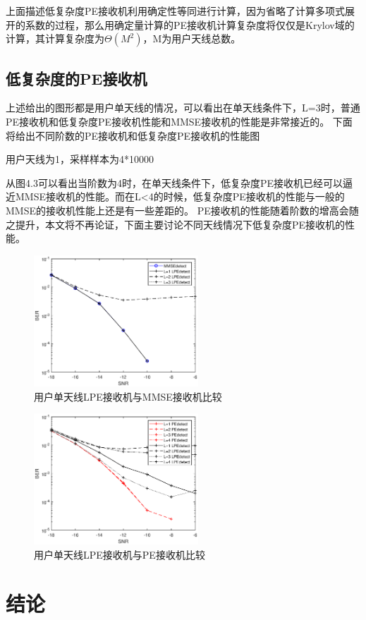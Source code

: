 \documentclass[bachelor,nocolorlinks, printoneside]{seuthesis} %
\begin{document}
\begin{Main}
上面描述低复杂度PE接收机利用确定性等同进行计算，因为省略了计算多项式展开的系数的过程，那么用确定量计算的PE接收机计算复杂度将仅仅是Krylov域的计算，其计算复杂度为$\Theta(M^2)$，M为用户天线总数。

\section{低复杂度的PE接收机}
上述给出的图形都是用户单天线的情况，可以看出在单天线条件下，L=3时，普通PE接收机和低复杂度PE接收机性能和MMSE接收机的性能是非常接近的。
下面将给出不同阶数的PE接收机和低复杂度PE接收机的性能图

用户天线为1，采样样本为4*10000

从图4.3可以看出当阶数为4时，在单天线条件下，低复杂度PE接收机已经可以逼近MMSE接收机的性能。而在L<4的时候，低复杂度PE接收机的性能与一般的MMSE的接收机性能上还是有一些差距的。
PE接收机的性能随着阶数的增高会随之提升，本文将不再论证，下面主要讨论不同天线情况下低复杂度PE接收机的性能。
\begin{figure}[htbp!]
	\centering \includegraphics[width=0.55\textwidth]{img/4_5.eps} \caption{用户单天线LPE接收机与MMSE接收机比较}
\end{figure}

\begin{figure}[htbp!]
	\centering \includegraphics[width=0.55\textwidth]{img/4_6.eps} \caption{用户单天线LPE接收机与PE接收机比较}
\end{figure}

\chapter{结论}

\end{Main} %



%



\newpage
\printindex %



%
%

 
\end{document}
